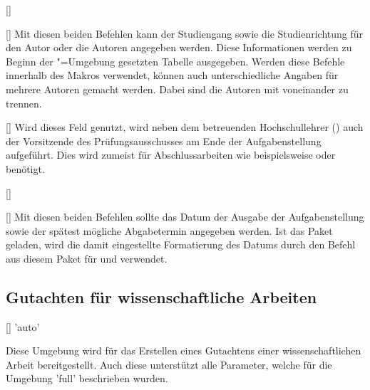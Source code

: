 \begin{Bundle*}{}
\begin{Declaration}{[]}
\begin{Declaration}[v2.02]{[]}
\printdeclarationlist%
%
%
Mit diesen beiden Befehlen kann der Studiengang sowie die Studienrichtung für 
den Autor oder die Autoren angegeben werden. Diese Informationen werden zu 
Beginn der "=Umgebung gesetzten Tabelle ausgegeben. Werden 
diese Befehle innerhalb des Makros  verwendet, können auch 
unterschiedliche Angaben für mehrere Autoren gemacht werden. Dabei sind die 
Autoren mit  voneinander zu trennen.
\end{Declaration}
\end{Declaration}

\begin{Declaration}{[]}
\printdeclarationlist%
%
Wird dieses Feld genutzt, wird neben dem betreuenden Hochschullehrer 
() auch der Vorsitzende des Prüfungsausschusses am Ende der 
Aufgabenstellung aufgeführt. Dies wird zumeist für Abschlussarbeiten wie 
beispielsweise \masterthesisname{} oder \diplomathesisname{} benötigt.
\end{Declaration}

\begin{Declaration}{[]}
\begin{Declaration}{[]}
\printdeclarationlist%
%
Mit diesen beiden Befehlen sollte das Datum der Ausgabe der Aufgabenstellung 
sowie der spätest mögliche Abgabetermin angegeben werden. Ist das Paket 
 geladen, wird die damit eingestellte Formatierung des Datums 
durch den Befehl  aus diesem Paket für  und 
 verwendet.
\end{Declaration}
\end{Declaration}


\subsection{Gutachten für wissenschaftliche Arbeiten}
%
%
\begin{Declaration}{[]}{%
  'auto'%
}
\begin{Declaration}{%
}
\begin{Declaration}{}
\printdeclarationlist%
%
Diese Umgebung wird für das Erstellen eines Gutachtens einer wissenschaftlichen 
Arbeit bereitgestellt. Auch diese unterstützt alle Parameter, welche für die 
Umgebung 'full' beschrieben wurden.


\end{Declaration}
\end{Declaration}
\end{Declaration}
\end{Bundle*}
